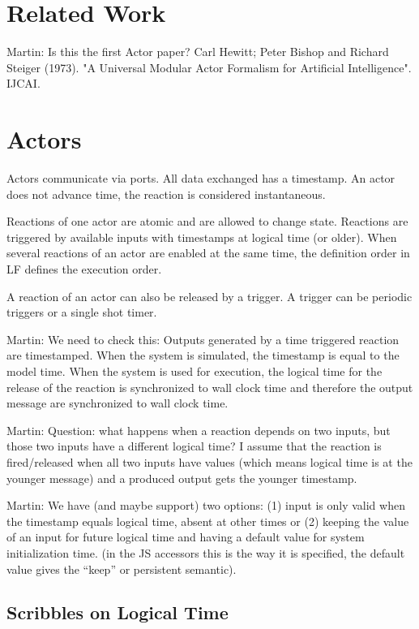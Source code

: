 \documentclass[sigconf]{acmart}
\newcommand{\martin}[1]{{\color{blue} Martin: #1}}
\begin{document}
\section{Related Work}
\label{sec:related}

\martin{Is this the first Actor paper? Carl Hewitt; Peter Bishop and Richard Steiger (1973). "A Universal Modular Actor Formalism for Artificial Intelligence". IJCAI.}

\section{Actors}
\label{sec:actor}

Actors communicate via ports. All data exchanged has a timestamp.
An actor does not advance time, the reaction is considered instantaneous.

Reactions of one actor are atomic and are allowed to change state.
Reactions are triggered by available inputs with timestamps at logical
time (or older). When several reactions of an actor are enabled at the
same time, the definition order in LF defines the execution order.

A reaction of an actor can also be released by a trigger. A trigger
can be periodic triggers or a single shot timer.

\martin{We need to check this: Outputs generated by a time triggered
reaction are timestamped. When the system is simulated, the timestamp
is equal to the model time. When the system is used for execution, the logical
time for the release of the reaction is synchronized to wall clock time and therefore
the output message are synchronized to wall clock time.}

\martin{Question: what happens when a reaction depends on two inputs, but
those two inputs have a different logical time?
I assume that the reaction is fired/released when all two inputs have values
(which means logical time is at the younger message)
and a produced output gets the younger timestamp.}

\martin{We have (and maybe support) two options: (1) input is only valid when
the timestamp equals logical time, absent at other times or (2) keeping the value
of an input for future logical time and having a default value for system initialization time.
(in the JS accessors this is the way it is specified, the default value gives the
``keep'' or persistent semantic).}

\subsection{Scribbles on Logical Time}
\end{document}
